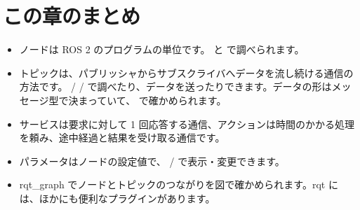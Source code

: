 \section*{この章のまとめ}

\begin{itemize}
  \item ノードは ROS 2 のプログラムの単位です。 と  で調べられます。
  \item トピックは、パブリッシャからサブスクライバへデータを流し続ける通信の方法です。 /  /  で調べたり、データを送ったりできます。データの形はメッセージ型で決まっていて、 で確かめられます。
  \item サービスは要求に対して 1 回応答する通信、アクションは時間のかかる処理を頼み、途中経過と結果を受け取る通信です。
  \item パラメータはノードの設定値で、 /  で表示・変更できます。
  \item rqt\_graph でノードとトピックのつながりを図で確かめられます。rqt には、ほかにも便利なプラグインがあります。
\end{itemize}
